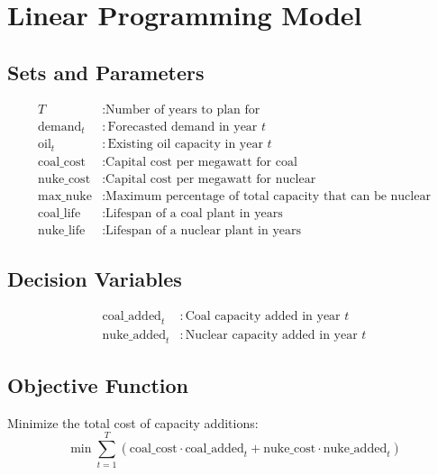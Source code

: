 \documentclass{article}
\begin{document}
\section*{Linear Programming Model}

\subsection*{Sets and Parameters}
\begin{align*}
    T & : \text{Number of years to plan for} \\
    \text{demand}_t & : \text{Forecasted demand in year } t \\
    \text{oil}_t & : \text{Existing oil capacity in year } t \\
    \text{coal\_cost} & : \text{Capital cost per megawatt for coal} \\
    \text{nuke\_cost} & : \text{Capital cost per megawatt for nuclear} \\
    \text{max\_nuke} & : \text{Maximum percentage of total capacity that can be nuclear} \\
    \text{coal\_life} & : \text{Lifespan of a coal plant in years} \\
    \text{nuke\_life} & : \text{Lifespan of a nuclear plant in years}
\end{align*}

\subsection*{Decision Variables}
\begin{align*}
    \text{coal\_added}_t & : \text{Coal capacity added in year } t \\
    \text{nuke\_added}_t & : \text{Nuclear capacity added in year } t
\end{align*}

\subsection*{Objective Function}
Minimize the total cost of capacity additions:
\[
\min \sum_{t=1}^{T} \left( \text{coal\_cost} \cdot \text{coal\_added}_t + \text{nuke\_cost} \cdot \text{nuke\_added}_t \right)
\]
\end{document}
